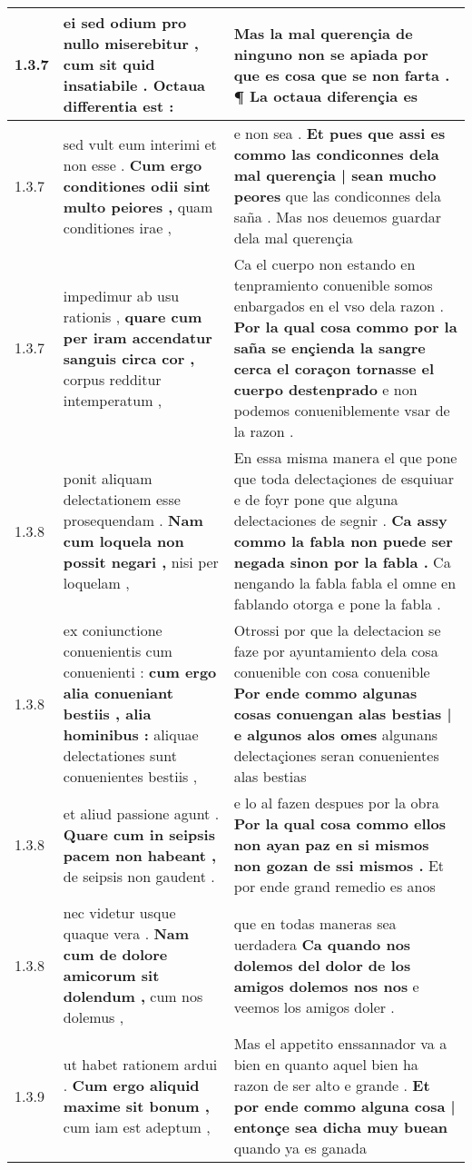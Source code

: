 \begin{tabular}{|p{1cm}|p{6.5cm}|p{6.5cm}|}
1.3.7 & ei sed odium pro nullo miserebitur , \textbf{ cum sit quid insatiabile . } Octaua differentia est : & Mas la mal querençia de ninguno non se apiada por que es cosa \textbf{ que se non farta . } ¶ La octaua diferençia es \\\hline
1.3.7 & sed vult eum interimi et non esse . \textbf{ Cum ergo conditiones odii sint multo peiores , } quam conditiones irae , & e non sea . \textbf{ Et pues que assi es commo las condiconnes dela mal querençia | sean mucho peores } que las condiconnes dela saña . Mas nos deuemos guardar dela mal querençia \\\hline
1.3.7 & impedimur ab usu rationis , \textbf{ quare cum per iram accendatur sanguis circa cor , } corpus redditur intemperatum , & Ca el cuerpo non estando en tenpramiento conuenible somos enbargados en el vso dela razon . \textbf{ Por la qual cosa commo por la saña se ençienda la sangre cerca el coraçon tornasse el cuerpo destenprado } e non podemos conueniblemente vsar de la razon . \\\hline
1.3.8 & ponit aliquam delectationem esse prosequendam . \textbf{ Nam cum loquela non possit negari , } nisi per loquelam , & En essa misma manera el que pone que toda delectaçiones de esquiuar e de foyr pone que alguna delectaciones de segnir . \textbf{ Ca assy commo la fabla non puede ser negada sinon por la fabla . } Ca nengando la fabla fabla el omne en fablando otorga e pone la fabla . \\\hline
1.3.8 & ex coniunctione conuenientis cum conuenienti : \textbf{ cum ergo alia conueniant bestiis , alia hominibus : } aliquae delectationes sunt conuenientes bestiis , & Otrossi por que la delectacion se faze por ayuntamiento dela cosa conuenible con cosa conuenible \textbf{ Por ende commo algunas cosas conuengan alas bestias | e algunos alos omes } algunans delectaçiones seran conuenientes alas bestias \\\hline
1.3.8 & et aliud passione agunt . \textbf{ Quare cum in seipsis pacem non habeant , } de seipsis non gaudent . & e lo al fazen despues por la obra \textbf{ Por la qual cosa commo ellos non ayan paz en si mismos non gozan de ssi mismos . } Et por ende grand remedio es anos \\\hline
1.3.8 & nec videtur usque quaque vera . \textbf{ Nam cum de dolore amicorum sit dolendum , } cum nos dolemus , & que en todas maneras sea uerdadera \textbf{ Ca quando nos dolemos del dolor de los amigos dolemos nos nos } e veemos los amigos doler . \\\hline
1.3.9 & ut habet rationem ardui . \textbf{ Cum ergo aliquid maxime sit bonum , } cum iam est adeptum , & Mas el appetito enssannador va a bien en quanto aquel bien ha razon de ser alto e grande . \textbf{ Et por ende commo alguna cosa | entonçe sea dicha muy buean } quando ya es ganada \\\hline

\end{tabular}
